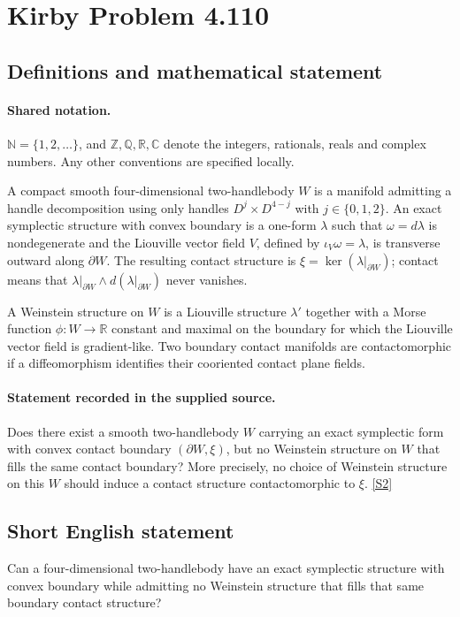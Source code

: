 \documentclass[11pt]{article}
\newcommand{\sref}[2]{\hyperlink{source:#1:#2}{[S#2]}}
\begin{document}
\section{Kirby Problem 4.110}\label{statement}

\subsection{Definitions and mathematical statement}

\paragraph{Shared notation.}$\mathbb N=\{1,2,\ldots\}$, and $\mathbb Z,\mathbb Q,\mathbb R,\mathbb C$ denote the integers, rationals, reals and complex numbers. Any other conventions are specified locally.


A compact smooth four-dimensional two-handlebody $W$ is a manifold admitting a handle decomposition using only handles $D^j\times D^{4-j}$ with $j\in\{0,1,2\}$. An exact symplectic structure with convex boundary is a one-form $\lambda$ such that $\omega=d\lambda$ is nondegenerate and the Liouville vector field $V$, defined by $\iota_V\omega=\lambda$, is transverse outward along $\partial W$. The resulting contact structure is $\xi=\ker(\lambda|_{\partial W})$; contact means that $\lambda|_{\partial W}\wedge d(\lambda|_{\partial W})$ never vanishes.

A Weinstein structure on $W$ is a Liouville structure $\lambda'$ together with a Morse function $\phi:W\to\mathbb R$ constant and maximal on the boundary for which the Liouville vector field is gradient-like. Two boundary contact manifolds are contactomorphic if a diffeomorphism identifies their cooriented contact plane fields.
\paragraph{Statement recorded in the supplied source.}
Does there exist a smooth two-handlebody $W$ carrying an exact symplectic form with convex contact boundary $(\partial W,\xi)$, but no Weinstein structure on $W$ that fills the same contact boundary? More precisely, no choice of Weinstein structure on this $W$ should induce a contact structure contactomorphic to $\xi$. \sref{statement}{2}
\subsection{Short English statement}
Can a four-dimensional two-handlebody have an exact symplectic structure with convex boundary while admitting no Weinstein structure that fills that same boundary contact structure?
\end{document}
